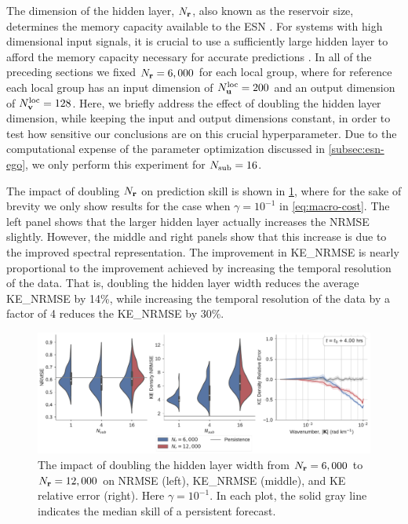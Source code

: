The dimension of the hidden layer, $N_{\mathbf{r}}$, also known as the reservoir size, determines the
memory capacity available to the ESN
\citep{jaeger_echo_2001,lukosevicius_practical_2012}.
For systems with high dimensional input signals, it is crucial to use a sufficiently large hidden layer to afford the memory capacity necessary for accurate
predictions \citep{hermans_memory_2010}.
In all of the preceding sections we fixed $N_{\mathbf{r}}=6,000$ for each local group,
where for reference each local group has an input dimension of
$N_{\mathbf{u}}^\text{loc}=200$ and an output dimension of $N_{\mathbf{v}}^\text{loc}=128$.
Here, we briefly address the effect of doubling the hidden layer dimension, while keeping the input and output dimensions constant, in order to test how
sensitive our conclusions are on this crucial hyperparameter.
Due to the computational expense of the parameter optimization discussed in
\cref{subsec:esn-ego}, we only perform this experiment for $N_\text{sub}=16$.

The impact of doubling $N_{\mathbf{r}}$ on prediction skill is shown in
\cref{fig:esn-size}, where for the sake of brevity we only show results for the
case when $\gamma=10^{-1}$ in \cref{eq:macro-cost}.
The left panel shows that the larger hidden layer actually increases the NRMSE slightly.
However, the middle and right panels show that this increase is due to the improved
spectral representation.
The improvement in KE\_NRMSE is nearly proportional to the improvement achieved by increasing
the temporal resolution of the data.
That is, doubling the hidden layer width reduces the average KE\_NRMSE by 14\%,
while increasing the temporal resolution of the data by a factor of 4 reduces
the KE\_NRMSE by 30\%.

\begin{figure}
    \centering
    \includegraphics[width=\textwidth]{../figures/rc_reservoir_size.pdf}
    \caption{The impact of doubling the hidden layer width from $N_{\mathbf{r}}=6,000$ to
        $N_{\mathbf{r}}=12,000$ on NRMSE (left), KE\_NRMSE (middle), and KE relative
        error (right).
        Here $\gamma=10^{-1}$.
        In each plot, the solid gray line indicates the median skill of a persistent
        forecast.
    }
    \label{fig:esn-size}
\end{figure}

